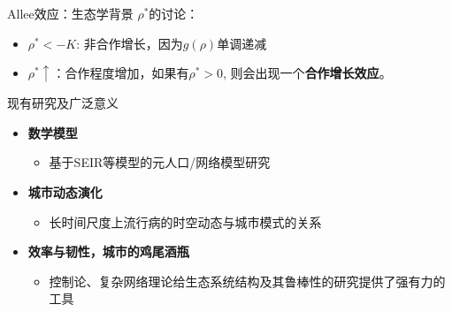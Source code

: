 \begin{frame}{Allee效应：生态学背景}
    $\rho^*$的讨论：
    \begin{itemize}
        \item $\rho^*< - K$: 非合作增长，因为$g(\rho)$单调递减
        \item $\rho^*\uparrow$：合作程度增加，如果有$\rho^*>0$, 则会出现一个\textbf{合作增长效应}。
    \end{itemize}
\end{frame}

\begin{frame}{现有研究及广泛意义}
    \begin{itemize}
        \item \textbf{数学模型}
        \begin{itemize}
            \item 基于SEIR等模型的元人口/网络模型研究
        \end{itemize}
        \vspace{0.5cm}
        \item \textbf{城市动态演化}\begin{itemize}
            \item 长时间尺度上流行病的时空动态与城市模式的关系
        \end{itemize}
        \vspace{0.5cm}
        \item \textbf{效率与韧性，城市的鸡尾酒瓶}\begin{itemize}
            \item 控制论、复杂网络理论给生态系统结构及其鲁棒性的研究提供了强有力的工具
        \end{itemize}
    \end{itemize}
\end{frame}